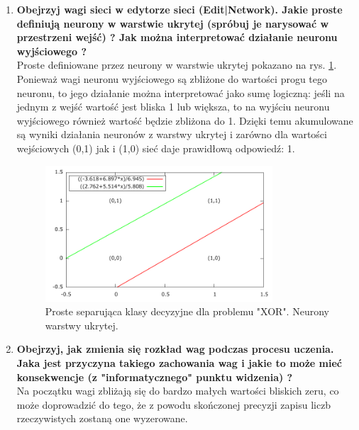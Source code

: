\begin{enumerate}
\item \textbf{
Obejrzyj wagi sieci w edytorze sieci (Edit|Network). Jakie proste definiują neurony w warstwie ukrytej (spróbuj je narysować w przestrzeni wejść) ? Jak można interpretować działanie neuronu wyjściowego ?}
\\Proste definiowane przez neurony w warstwie ukrytej pokazano na rys. \ref{fig:prosta_separujaca_xor}. Ponieważ wagi neuronu wyjściowego są zbliżone do wartości progu tego neuronu, to jego działanie można interpretować jako sumę logiczną: jeśli na jednym z wejść wartość jest bliska 1 lub większa, to na wyjściu neuronu wyjściowego również wartość będzie zbliżona do 1. Dzięki temu akumulowane są wyniki działania neuronów z warstwy ukrytej i zarówno dla wartości wejściowych (0,1) jak i (1,0) sieć daje prawidłową odpowiedź: 1.

\begin{figure}[h]
\centering
\includegraphics[width=0.8\textwidth]{dane/part1/zad2/separacja_xor_ukryta}
\caption{Proste separująca klasy decyzyjne dla problemu "XOR". Neurony warstwy ukrytej.\label{fig:prosta_separujaca_xor}}
\end{figure}


\item \textbf{
Obejrzyj, jak zmienia się rozkład wag podczas procesu uczenia. Jaka jest przyczyna takiego zachowania wag i jakie to może mieć konsekwencje (z "informatycznego" punktu widzenia) ?}
\\Na początku wagi zbliżają się do bardzo małych wartości bliskich zeru, co może doprowadzić do tego, że z powodu skończonej precyzji zapisu liczb rzeczywistych zostaną one wyzerowane.

\end{enumerate}

